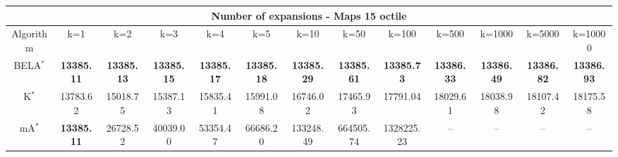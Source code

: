 \begin{tabular}{c|cccccccccccc}\toprule
\multicolumn{13}{c}{Number of expansions - Maps 15 octile}\\ \midrule
Algorithm & k=1 & k=2 & k=3 & k=4 & k=5 & k=10 & k=50 & k=100 & k=500 & k=1000 & k=5000 & k=10000 \\ \midrule
BELA$^*$ & \textbf{13385.11} & \textbf{13385.13} & \textbf{13385.15} & \textbf{13385.17} & \textbf{13385.18} & \textbf{13385.29} & \textbf{13385.61} & \textbf{13385.73} & \textbf{13386.33} & \textbf{13386.49} & \textbf{13386.82} & \textbf{13386.93} \\
K$^*$ & 13783.62 & 15018.75 & 15387.13 & 15835.41 & 15991.08 & 16746.02 & 17465.93 & 17791.04 & 18029.61 & 18038.98 & 18107.42 & 18175.58 \\
mA$^*$ & \textbf{13385.11} & 26728.52 & 40039.00 & 53354.47 & 66686.20 & 133248.49 & 664505.74 & 1328225.23 & -- & -- & -- & -- \\ \bottomrule 
\end{tabular}
